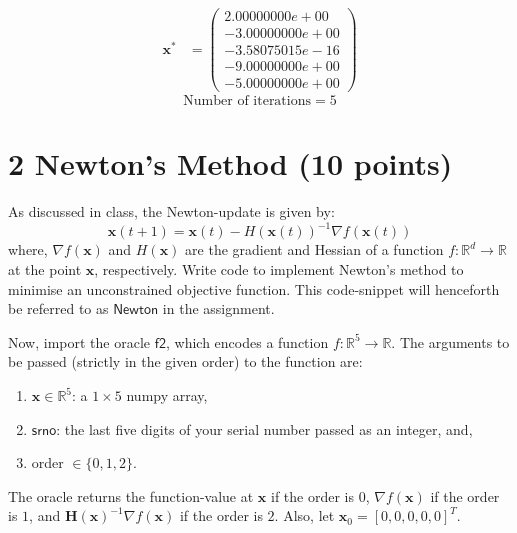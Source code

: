 \documentclass[12pt,a4paper]{article}
\newcommand{\R}{\mathbb{R}}
\theoremstyle{remark}
\begin{document}
\begin{enumerate}
    \begin{align*}
        \mathbf{x}^* &= \begin{pmatrix}
            2.00000000e+00 \\
            -3.00000000e+00 \\
            -3.58075015e-16 \\
            -9.00000000e+00 \\
            -5.00000000e+00
        \end{pmatrix}
    \end{align*}
    $$\text{Number of iterations} = 5$$
\end{enumerate}

\newpage

\section*{2 Newton's Method (10 points)}

As discussed in class, the Newton-update is given by:
$$\mathbf{x}(t+1) = \mathbf{x}(t) - H(\mathbf{x}(t))^{-1} \nabla f(\mathbf{x}(t))$$
where, $\nabla f(\mathbf{x})$ and $H(\mathbf{x})$ are the gradient and Hessian of a function $f : \R^d \to \R$ at the point $\mathbf{x}$, respectively. Write code to implement Newton's method to minimise an unconstrained objective function. This code-snippet will henceforth be referred to as $\mathsf{Newton}$ in the assignment.

Now, import the oracle $\mathsf{f2}$, which encodes a function $f : \R^5 \to \R$. The arguments to be passed (strictly in the given order) to the function are:

\begin{enumerate}
    \item $\mathbf{x} \in \R^5$: a $1 \times 5$ numpy array,
    \item $\mathsf{srno}$: the last five digits of your serial number passed as an integer, and,
    \item order $\in \{0, 1, 2\}$.
\end{enumerate}

The oracle returns the function-value at $\mathbf{x}$ if the order is $0$, $\nabla f(\mathbf{x})$ if the order is $1$, and $\mathbf{H(x)}^{-1} \nabla f(\mathbf{x})$ if the order is $2$. Also, let $\mathbf{x}_0 = [0, 0, 0, 0, 0]^T$.
\end{document}
